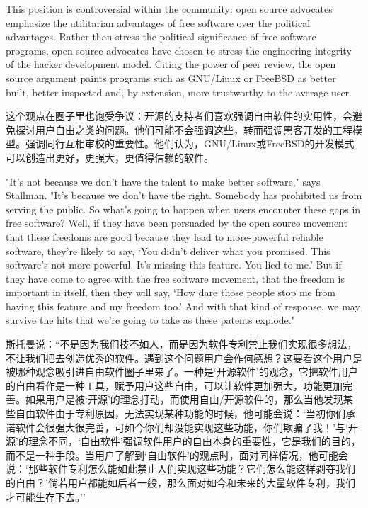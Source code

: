 \ifdefined\vtwo
\ifdefined\eng
This position is controversial within the community: open source advocates emphasize the utilitarian advantages of free software over the political advantages. Rather than stress the political significance of free software programs, open source advocates have chosen to stress the engineering integrity of the hacker development model. Citing the power of peer review, the open source argument paints programs such as GNU/Linux or FreeBSD as better built, better inspected and, by extension, more trustworthy to the average user.
\fi

\ifdefined\chs
这个观点在圈子里也饱受争议：开源的支持者们喜欢强调自由软件的实用性，会避免探讨用户自由之类的问题。他们可能不会强调这些，转而强调黑客开发的工程模型。强调同行互相审校的重要性。他们认为，GNU/Linux或FreeBSD的开发模式可以创造出更好，更强大，更值得信赖的软件。
\fi
\fi

\ifdefined\vone

\ifdefined\eng
"It's not because we don't have the talent to make better software," says Stallman. "It's because we don't have the right. Somebody has prohibited us from serving the public. So what's going to happen when users encounter these gaps in free software? Well, if they have been persuaded by the open source movement that these freedoms are good because they lead to more-powerful reliable software, they're likely to say, `You didn't deliver what you promised. This software's not more powerful. It's missing this feature. You lied to me.' But if they have come to agree with the free software movement, that the freedom is important in itself, then they will say, `How dare those people stop me from having this feature and my freedom too.' And with that kind of response, we may survive the hits that we're going to take as these patents explode." 
\fi

\ifdefined\chs
斯托曼说：``不是因为我们技不如人，而是因为软件专利禁止我们实现很多想法，不让我们把去创造优秀的软件。遇到这个问题用户会作何感想？这要看这个用户是被哪种观念吸引进自由软件圈子里来了。一种是`开源软件'的观念，它把软件用户的自由看作是一种工具，赋予用户这些自由，可以让软件更加强大，功能更加完善。如果用户是被`开源'的理念打动，而使用自由/开源软件的，那么当他发现某些自由软件由于专利原因，无法实现某种功能的时候，他可能会说：`当初你们承诺软件会很强大很完善，可如今你们却没能实现这些功能，你们欺骗了我！'与`开源'的理念不同，`自由软件'强调软件用户的自由本身的重要性，它是我们的目的，而不是一种手段。当用户了解到`自由软件'的观点时，面对同样情况，他可能会说：`那些软件专利怎么能如此禁止人们实现这些功能？它们怎么能这样剥夺我们的自由？'倘若用户都能如后者一般，那么面对如今和未来的大量软件专利，我们才可能生存下去。''
\fi

